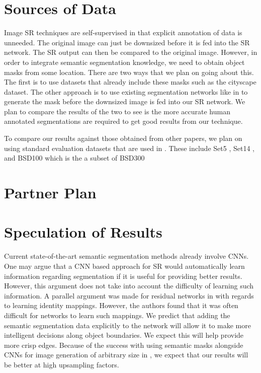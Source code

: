 \documentclass[10pt,twocolumn,letterpaper]{article}
\begin{document}
\section{Sources of Data}
Image SR techniques are self-supervised in that explicit annotation of data is unneeded. The original image can just be downsized before it is fed into the SR network. The SR output can then be compared to the original image. However, in order to integrate semantic segmentation knowledge, we need to obtain object masks from some location. There are two ways that we plan on going about this. The first is to use datasets that already include these masks such as the cityscape dataset. The other approach is to use existing segmentation networks like in \cite{FullyConvolutionalSS} to generate the mask before the downsized image is fed into our SR network. We plan to compare the results of the two to see is the more accurate human annotated segmentations are required to get good results from our technique.

To compare our results against those obtained from other papers, we plan on using standard evaluation datasets that are used in \cite{SRGAN}. These include Set5 \cite{Set5}, Set14 \cite{Set14}, and BSD100 which is the a subset of BSD300 \cite{BSD300}


\section{Partner Plan}


\section{Speculation of Results}
Current state-of-the-art semantic segmentation methods already involve CNNs.
One may argue that a CNN based approach for SR would automatically learn
information regarding segmentation if it is useful for providing better
results. However, this argument does not take into account the difficulty of
learning such information. A parallel argument was made for residual networks
in \cite{ResNet} with regards to learning identity mappings. However, the
authors found that it was often difficult for networks to learn such mappings.
We predict that adding the semantic segmentation data explicitly to the network
will allow it to make more intelligent decisions along object boundaries. We
expect this will help provide more crisp edges. Because of the success with
using semantic masks alongside CNNs for image generation of arbitrary size in
\cite{ImageSynthesis}, we expect that our results will be better at high
upsampling factors.

{\small


}
\end{document}
